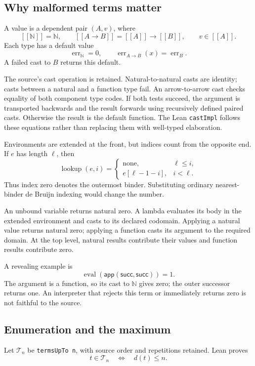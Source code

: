 \documentclass[11pt,letterpaper]{article}
\newcommand{\llbracket}{[\![}
\newcommand{\rrbracket}{]\!]}
\theoremstyle{definition}
\newcommand{\N}{\mathbb N}
\newcommand{\ev}{\operatorname{eval}}
\newcommand{\code}[1]{\texttt{#1}}
\newcommand{\checked}[1]{\par\nopagebreak[3]\noindent{\small\textsf{Lean theorem: }\texttt{#1}}\par}
\begin{document}
\subsection{Why malformed terms matter}
A value is a dependent pair \((A,v)\), where
\[
 \llbracket\N\rrbracket=\N,\qquad
 \llbracket A\to B\rrbracket=\llbracket A\rrbracket\to\llbracket B\rrbracket,
 \qquad v\in\llbracket A\rrbracket.
\]
Each type has a default value
\[
 \operatorname{err}_{\N}=0,\qquad
 \operatorname{err}_{A\to B}(x)=\operatorname{err}_B.
\]
A failed cast to \(B\) returns this default.

The source's cast operation is retained. Natural-to-natural casts are
identity; casts between a natural and a function type fail. An
arrow-to-arrow cast checks equality of both component type codes.
If both tests succeed, the argument is transported backwards and the
result forwards using recursively defined paired casts. Otherwise the
result is the default function. The Lean \code{castImpl} follows these
equations rather than replacing them with well-typed elaboration.

Environments are extended at the front, but indices count from the
opposite end. If \(e\) has length \(\ell\), then
\[
 \operatorname{lookup}(e,i)=
 \begin{cases}
 \mathrm{none},&\ell\le i,\\
 e[\ell-1-i],&i<\ell.
 \end{cases}
\]
Thus index zero denotes the outermost binder. Substituting ordinary
nearest-binder de Bruijn indexing would change the number.

An unbound variable returns natural zero. A lambda evaluates its body
in the extended environment and casts to its declared codomain. Applying
a natural value returns natural zero; applying a function casts its
argument to the required domain. At the top level, natural results
contribute their values and function results contribute zero.

A revealing example is
\[
           \ev(\mathsf{app}(\mathsf{succ},\mathsf{succ}))=1.
\]
The argument is a function, so its cast to \(\N\) gives zero; the outer
successor returns one. An interpreter that rejects this term or
immediately returns zero is not faithful to the source.

\subsection{Enumeration and the maximum}
Let \(\mathcal T_n\) be \code{termsUpTo n}, with source order and repetitions
retained. Lean proves
\[
             t\in\mathcal T_n\quad\Longleftrightarrow\quad d(t)\le n.
\]
\checked{termsUpTo\_correct}
\end{document}
